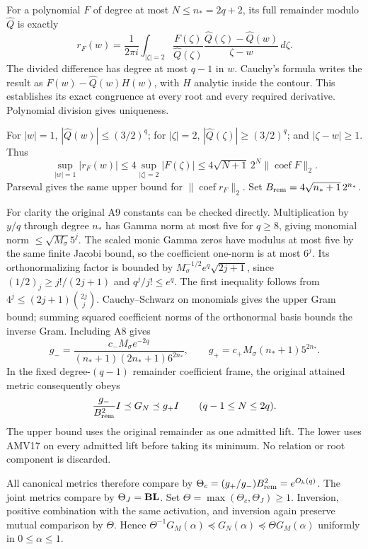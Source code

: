 \documentclass[11pt]{article}
\begin{document}
For a polynomial \(F\) of degree at most \(N\le n_*=2q+2\), its full remainder modulo \(\widehat Q\) is exactly \[
r_F(w)=\frac1{2\pi i}\int_{|\zeta|=2}
\frac{F(\zeta)}{\widehat Q(\zeta)}
\frac{\widehat Q(\zeta)-\widehat Q(w)}{\zeta-w}\,d\zeta.
\tag{AMV17}
\] The divided difference has degree at most \(q-1\) in \(w\). Cauchy's formula writes the result as \(F(w)-\widehat Q(w)H(w)\), with \(H\) analytic inside the contour. This establishes its exact congruence at every root and every required derivative. Polynomial division gives uniqueness.

For \(|w|=1\), \(|\widehat Q(w)|\le(3/2)^q\); for \(|\zeta|=2\), \(|\widehat Q(\zeta)|\ge(3/2)^q\); and \(|\zeta-w|\ge1\). Thus \[
\sup_{|w|=1}|r_F(w)|
\le4\sup_{|\zeta|=2}|F(\zeta)|
\le4\sqrt{N+1}\,2^N\|\operatorname{coef}F\|_2.
\] Parseval gives the same upper bound for \(\|\operatorname{coef}r_F\|_2\). Set \(B_{\rm rem}=4\sqrt{n_*+1}\,2^{n_*}\).

For clarity the original A9 constants can be checked directly. Multiplication by \(y/q\) through degree \(n_*\) has Gamma norm at most five for \(q\ge8\), giving monomial norm \(\le\sqrt{M_\sigma}5^j\). The scaled monic Gamma zeros have modulus at most five by the same finite Jacobi bound, so the coefficient one-norm is at most \(6^j\). Its orthonormalizing factor is bounded by \(M_\sigma^{-1/2}e^q\sqrt{2j+1}\), since \((1/2)_j\ge j!/(2j+1)\) and \(q^j/j!\le e^q\). The first inequality follows from \(4^j\le(2j+1)\binom{2j}{j}\). Cauchy--Schwarz on monomials gives the upper Gram bound; summing squared coefficient norms of the orthonormal basis bounds the inverse Gram. Including A8 gives \[
g_-=\frac{c_-M_\sigma e^{-2q}}
{(n_*+1)(2n_*+1)6^{2n_*}},\qquad
g_+=c_+M_\sigma(n_*+1)5^{2n_*}.
\] In the fixed degree-\((q-1)\) remainder coefficient frame, the original attained metric consequently obeys \[
\frac{g_-}{B_{\rm rem}^2}I\preceq G_N\preceq g_+I
\qquad(q-1\le N\le2q).
\] The upper bound uses the original remainder as one admitted lift. The lower uses AMV17 on every admitted lift before taking its minimum. No relation or root component is discarded.

All canonical metrics therefore compare by \(\Theta_c=(g_+/g_-)B_{\rm rem}^2=e^{O_h(q)}\). The joint metrics compare by \(\Theta_J={\bf B}{\bf L}\). Set \(\Theta=\max(\Theta_c,\Theta_J)\ge1\). Inversion, positive combination with the same activation, and inversion again preserve mutual comparison by \(\Theta\). Hence \(\Theta^{-1}G_M(\alpha)\preceq G_N(\alpha)\preceq\Theta G_M(\alpha)\) uniformly in \(0\le\alpha\le1\).
\end{document}
